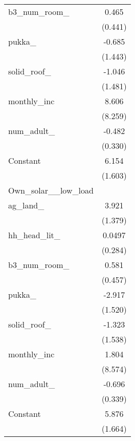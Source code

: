 {\begin{tabular}{l*{1}{c}}
b3\_num\_room\_        &       0.465         \\
                    &     (0.441)         \\
\addlinespace
pukka\_              &      -0.685         \\
                    &     (1.443)         \\
\addlinespace
solid\_roof\_         &      -1.046         \\
                    &     (1.481)         \\
\addlinespace
monthly\_inc         &       8.606         \\
                    &     (8.259)         \\
\addlinespace
num\_adult\_          &      -0.482         \\
                    &     (0.330)         \\
\addlinespace
Constant            &       6.154\sym{***}\\
                    &     (1.603)         \\
\midrule
Own\_solar\_\_low\_load &                     \\
ag\_land\_            &       3.921\sym{***}\\
                    &     (1.379)         \\
\addlinespace
hh\_head\_lit\_        &      0.0497         \\
                    &     (0.284)         \\
\addlinespace
b3\_num\_room\_        &       0.581         \\
                    &     (0.457)         \\
\addlinespace
pukka\_              &      -2.917\sym{*}  \\
                    &     (1.520)         \\
\addlinespace
solid\_roof\_         &      -1.323         \\
                    &     (1.538)         \\
\addlinespace
monthly\_inc         &       1.804         \\
                    &     (8.574)         \\
\addlinespace
num\_adult\_          &      -0.696\sym{**} \\
                    &     (0.339)         \\
\addlinespace
Constant            &       5.876\sym{***}\\
                    &     (1.664)         \\

\end{tabular}}
